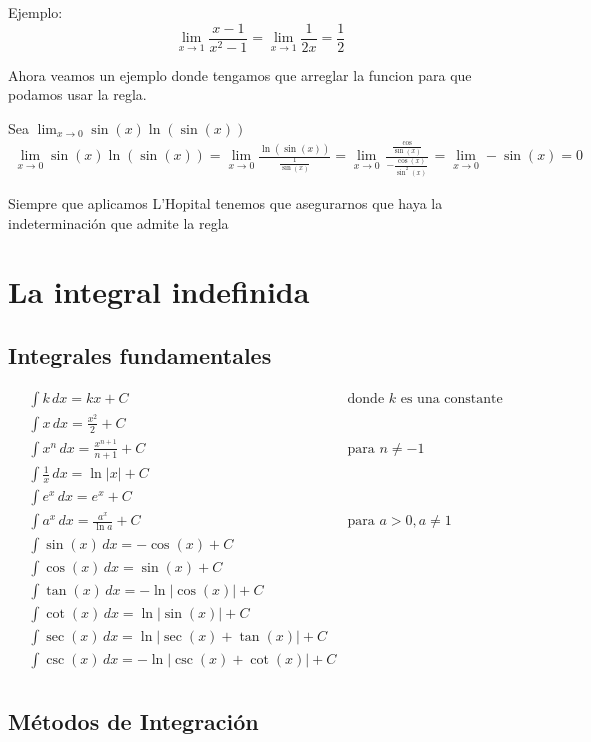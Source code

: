 \documentclass[12pt]{article}
\begin{document}
Ejemplo: $$\lim_{x\to1}{\frac{x-1}{x^2-1}}=\lim_{x\to1}{\frac{1}{2x}}=\frac{1}{2}$$

Ahora veamos un ejemplo donde tengamos que arreglar la funcion para que podamos usar la regla.

Sea $\lim_{x\to0}\sin(x)\ln(\sin(x))$
\begin{align*}
\lim_{x\to0}\sin(x)\ln(\sin(x))=\lim_{x\to0}\frac{\ln(\sin(x))}{\frac{1}{\sin(x)}}=\lim_{x\to0}\frac{\frac{\cos}{\sin(x)}}{-\frac{\cos(x)}{\sin^2(x)}}=\lim_{x\to0}-\sin(x)=0
\end{align*}

Siempre que aplicamos L'Hopital tenemos que asegurarnos que haya la indeterminación que admite la regla

\section{La integral indefinida}
\subsection{Integrales fundamentales}
\begin{align*}
    &\int k \, dx = kx + C & \text{donde } k \text{ es una constante} \\[10pt]
    &\int x \, dx = \frac{x^2}{2} + C \\[10pt]
    &\int x^n \, dx = \frac{x^{n+1}}{n+1} + C & \text{para } n \neq -1 \\[10pt]
    &\int \frac{1}{x} \, dx = \ln|x| + C \\[10pt]
    &\int e^x \, dx = e^x + C \\[10pt]
    &\int a^x \, dx = \frac{a^x}{\ln a} + C & \text{para } a > 0, a \neq 1 \\[10pt]
    &\int \sin(x) \, dx = -\cos(x) + C \\[10pt]
    &\int \cos(x) \, dx = \sin(x) + C \\[10pt]
    &\int \tan(x) \, dx = -\ln|\cos(x)| + C \\[10pt]
    &\int \cot(x) \, dx = \ln|\sin(x)| + C \\[10pt]
    &\int \sec(x) \, dx = \ln|\sec(x) + \tan(x)| + C \\[10pt]
    &\int \csc(x) \, dx = -\ln|\csc(x) + \cot(x)| + C \\[10pt]
\end{align*}
\subsection{Métodos de Integración}
\end{document}
